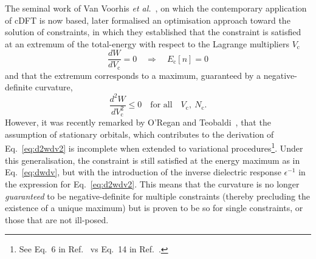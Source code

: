 The seminal work of 
Van Voorhis {\it et al.}~\cite{PhysRevA.72.024502,
:/content/aip/journal/jcp/125/16/10.1063/1.2360263,
:/content/aip/journal/jcp/140/18/10.1063/1.4862497,
doi:10.1021/ct0503163,
doi:10.1021/jp061848y,
:/content/aip/journal/jcp/127/16/10.1063/1.2800022,
PhysRevB.94.035159}, 
on which the contemporary application of cDFT is now based, 
later formalised an {optimisation} approach 
toward the solution of constraints, 
in which they established 
that the constraint is satisfied at an extremum of the total-energy 
with respect to the Lagrange multipliers $V_\textrm{c}$
%
\begin{equation}
\frac{dW}{dV_\textrm{c}}=0 
\quad\Rightarrow\quad 
E_\textrm{c}[n]=0
\label{eq:dwdv}
\end{equation}
%
and that the extremum corresponds to a maximum, 
guaranteed by a negative-definite curvature, 
%
\begin{equation}
\frac{d^2W}{dV_\textrm{c}^2}\leq 0 
\quad\mbox{for all}\quad
V_\textrm{c},\ N_\textrm{c}.
\label{eq:d2wdv2}
\end{equation}
%
{
However, 
it was recently remarked by 
O'Regan and Teobaldi~\cite{PhysRevB.94.035159}, 
that the assumption of {stationary} orbitals, 
which contributes to the derivation of Eq.~\eqref{eq:d2wdv2} 
is incomplete when 
extended to variational procedures\footnote{See Eq.~6 in Ref.~\cite{PhysRevA.72.024502}
vs Eq.~14 in Ref.~\cite{PhysRevB.94.035159}.}.
%
%
Under this generalisation, 
the constraint is still satisfied at the energy maximum as in Eq.~\eqref{eq:dwdv}, 
but with the introduction of the inverse dielectric response $\epsilon^{-1}$ 
in the expression for Eq.~\eqref{eq:d2wdv2}.
% 
This means that the curvature is no longer 
{\it guaranteed} to be negative-definite for multiple constraints 
(thereby precluding the existence of a unique maximum) 
but is proven to be so for single constraints, 
or those that are not ill-posed.}



